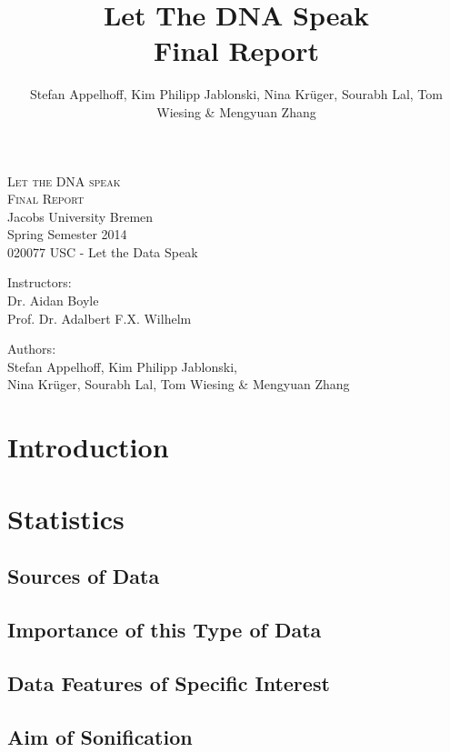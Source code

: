 \documentclass[10pt]{article}
\title{Let The DNA Speak\\Final Report}
\author{Stefan Appelhoff, Kim Philipp Jablonski, Nina Krüger, Sourabh Lal, Tom Wiesing \& Mengyuan Zhang}
\begin{document}
\begin{titlepage}
\thispagestyle{empty}
\begin{center}

\textsc{\huge Let the DNA speak}\\[2cm]
\textsc{\Huge Final Report}\\[6cm]

\Large{Jacobs University Bremen\\
Spring Semester 2014\\020077 USC - Let the Data Speak}
\vspace*{1.2cm}

\Large{Instructors:\\Dr. Aidan Boyle\\Prof. Dr. Adalbert F.X. Wilhelm}
\vspace*{1.2cm}

\Large{Authors:\\Stefan Appelhoff, Kim Philipp Jablonski, \\Nina Krüger, Sourabh Lal, Tom Wiesing \& Mengyuan Zhang}
\vspace*{1.2cm}

\end{center}

\end{titlepage}


\clearpage
\thispagestyle{empty}
\tableofcontents
\newpage

\setcounter{page}{1}
\section{Introduction}

\section{Statistics}
\subsection{Sources of Data}
\subsection{Importance of this Type of Data}
\subsection{Data Features of Specific Interest}
\subsection{Aim of Sonification}
\end{document}
